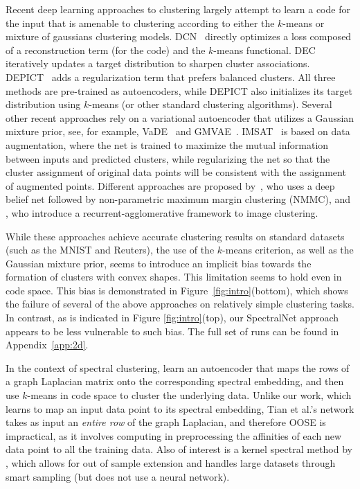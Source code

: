 \documentclass{article} %
\begin{document}
Recent deep learning approaches to clustering largely attempt to learn a code for the input that is amenable to clustering according to either the $k$-means or mixture of gaussians clustering models.  DCN~\citep{yang2016towards} directly optimizes a loss composed of a reconstruction term (for the code) and the $k$-means functional. DEC~\citep{xie2016unsupervised} iteratively updates a target distribution to sharpen cluster associations.
DEPICT~\citep{dizaji2017deep} adds a regularization term that prefers balanced clusters. All three methods are pre-trained as autoencoders, while DEPICT also initializes its target distribution using $k$-means (or other standard clustering algorithms). Several other recent approaches rely on a variational autoencoder that utilizes a Gaussian mixture prior, see, for example, VaDE~\citep{zheng2016variational} and GMVAE~\citep{dilokthanakul2016deep}.
IMSAT~\citep{hu2017learning} is based on data augmentation, where the net is trained to maximize the mutual information between inputs and predicted clusters, while regularizing the net so that the cluster assignment of original data points will be consistent with the assignment of augmented points.
Different approaches are proposed by~\citet{chen2015deep}, who uses a deep belief net followed by non-parametric maximum margin clustering (NMMC), and \citet{yang2016joint}, who introduce a recurrent-agglomerative framework to image clustering.

While these approaches achieve accurate clustering results on standard datasets (such as the MNIST and Reuters), the use of the $k$-means criterion, as well as the Gaussian mixture prior, seems to introduce an implicit bias towards the formation of clusters with convex shapes. This limitation seems to hold even in code space. This bias is demonstrated in Figure~\ref{fig:intro}(bottom), which shows the failure of several of the above approaches on relatively simple clustering tasks.
In contrast, as is indicated in Figure \ref{fig:intro}(top), our SpectralNet approach appears to be less vulnerable to such bias. The full set of runs can be found in Appendix~\ref{app:2d}.

In the context of spectral clustering, \citet{tian2014learning} learn an autoencoder that maps the rows of a graph Laplacian matrix onto the corresponding spectral embedding, and then use $k$-means in code space to cluster the underlying data. Unlike our work, which learns to map an input data point to its spectral embedding, Tian et al.'s network takes as input an \textit{entire row} of the graph Laplacian, and therefore OOSE is impractical, as it involves computing in preprocessing the affinities of each new data point to all the training data. Also of interest is a kernel spectral method by \citet{alzate2010multiway}, which allows for out of sample extension and handles large datasets through smart sampling (but does not use a neural network).
\end{document}
